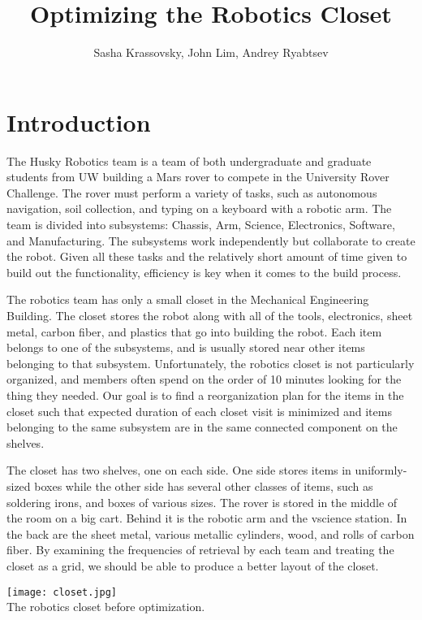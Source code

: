 \documentclass[10pt]{article}
\title{Optimizing the Robotics Closet}
\author{Sasha Krassovsky, John Lim, Andrey Ryabtsev}
\theoremstyle{named}
\begin{document}
\maketitle
\pagebreak

\section{Introduction}
The Husky Robotics team is a team of both undergraduate and graduate students
from UW building a Mars rover to compete in the University Rover Challenge.
The rover must perform a variety of tasks, such as autonomous navigation, soil
collection, and typing on a keyboard with a robotic arm. The team is divided
into subsystems: Chassis, Arm, Science, Electronics, Software, and Manufacturing.
The subsystems work independently but collaborate to create the robot. Given
all these tasks and the relatively short amount of time given to build out the
functionality, efficiency is key when it comes to the build process.
\par
The robotics team has only a small closet in the Mechanical Engineering Building.
The closet stores the robot along with all of the tools, electronics, sheet metal,
carbon fiber, and plastics that go into building the robot. Each item belongs to
one of the subsystems, and is usually stored near other items belonging to that
subsystem. Unfortunately, the robotics closet is not particularly organized, and
members often spend on the order of 10 minutes looking for the thing they needed.
Our goal is to find a reorganization plan for the items in the closet such that
expected duration of each closet visit is minimized and items belonging to the
same subsystem are in the same connected component on the shelves.
\par
The closet has two shelves, one on each side. One side stores items in
uniformly-sized boxes while the other side has several other classes of items,
such as soldering irons, and boxes of various sizes. The rover is stored in
the middle of the room on a big cart. Behind it is the robotic arm and the
vscience station. In the back are the sheet metal, various metallic cylinders,
wood, and rolls of carbon fiber. By examining the frequencies of retrieval
by each team and treating the closet as a grid, we should be able to produce
a better layout of the closet.

\begin{center}
  \texttt{[image: closet.jpg]} \\
  The robotics closet before optimization. 
\end{center}
\end{document}
